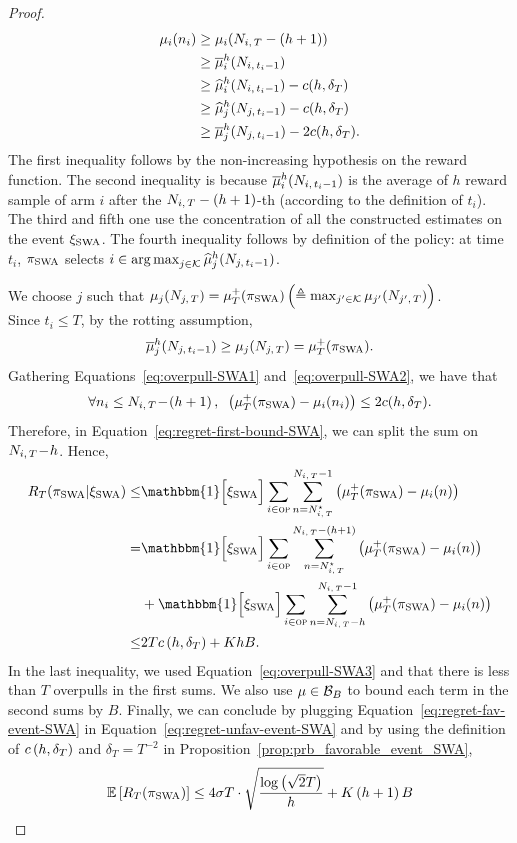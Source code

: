 \begin{proof}
\begin{align}
\label{eq:overpull-SWA1}
\mu_i(n_i) &\geq \mu_i(N_{i,\,T} - (h+1) )\nonumber\\
 &\geq \overline{\mu}_i^h(N_{i,\,t_i -1}) \nonumber\\
 &\geq \widehat{\mu}_i^h(N_{i,\,t_i -1}) - c(h, \delta_T) \nonumber\\
& \geq \widehat{\mu}_j^h(N_{j,\,t_i -1}) - c(h, \delta_T)  \nonumber\\
& \geq \overline{\mu}_j^h(N_{j,\,t_i -1}) - 2c(h, \delta_T). 
\end{align}
%
The first inequality follows by the non-increasing hypothesis on the reward function. The second inequality is because $\overline{\mu}_i^h(N_{i,\,t_i -1})$ is the average of $h$ reward sample of arm $i$ after the $N_{i,\,T} - (h+1)$-th (according to the definition of $t_i$). The third and fifth one use the concentration of all the constructed estimates on the event $\xi_{\rm SWA}$.  The fourth  inequality follows by definition of the policy: at time $t_i$, $\pi_{\rm SWA}$ selects $i \in \operatorname*{arg\,max}_{j \in \mathcal{K}} \widehat{\mu}_j^h(N_{j,\,t_i -1})$.

We choose $j$ such that $ \mu_j(N_{j,\,T}) = \mu^+_T(\pi_{\rm SWA}) \left(\triangleq \max_{j'\in \mathcal{K}} \mu_{j'}(N_{j',\,T})\right)$. \\Since $t_i \leq T$, by the rotting assumption, 
\begin{equation}
\label{eq:overpull-SWA2}
 \overline{\mu}_j^h(N_{j,\,t_i -1}) \geq \mu_j(N_{j,\,T}) = \mu^+_T(\pi_{\rm SWA}).
\end{equation}
%
Gathering Equations~\ref{eq:overpull-SWA1} and~\ref{eq:overpull-SWA2}, we have that 
\begin{equation}
\label{eq:overpull-SWA3}
\forall n_i \leq N_{i,\,T} \!-\! \left(h+1\right), \;\;   \left(\mu^+_T(\pi_{\rm SWA}) - \mu_i(n_i)\right) \leq 2c(h, \delta_T).
\end{equation}
Therefore,  in Equation~\ref{eq:regret-first-bound-SWA}, we can split the sum on $N_{i,\,T} \!-\! h$. Hence, 
\begin{align}
\regret(\piSWA| \HPSWA) \leq&  \mathbbm{1} \Big[\HPSWA\Big] \sum_{i\in \overpullSet}    \sum_{n=\NiT^\star}^{\NiT-1} \pa{\mu^+_T(\piSWA) - \mu_i(n)}\nonumber\\
=&  \mathbbm{1} \Big[\HPSWA\Big] \sum_{i\in \overpullSet}    \sum_{n=\NiT^\star}^{\NiT-\pa{h+1}} \pa{\mu^+_T(\piSWA) - \mu_i(n)} \nonumber\\ 
&+ \mathbbm{1} \Big[\HPSWA\Big] \sum_{i\in \overpullSet} \sum_{n=\NiT - h }^{\NiT-1} \pa{\mu^+_T(\piSWA) - \mu_i(n)}\nonumber\\
\leq& 2Tc\pa{h,\delta_T} + KhB.
\label{eq:regret-fav-event-SWA}
\end{align}
%
In the last inequality, we used Equation~\ref{eq:overpull-SWA3} and that there is less than $T$ overpulls in the first sums. We also use $\mu \in \mathcal{B}_{B}$ to bound each term in the second sums by $B$. Finally,  we can conclude by plugging Equation~\ref{eq:regret-fav-event-SWA} in Equation~\ref{eq:regret-unfav-event-SWA} and by using the definition of $c\left(h,\delta_T\right)$ and $\delta_T= T^{-2}$ in Proposition~\ref{prop:prb_favorable_event_SWA},
\[
\mathbb{E}\left[R_T(\pi_{\rm SWA})\right] \leq 4\sigma T\cdot\sqrt{\frac{\log\left(\sqrt{2}T\right)}{h}} + K\left(h+1\right)B
\]
\end{proof}
